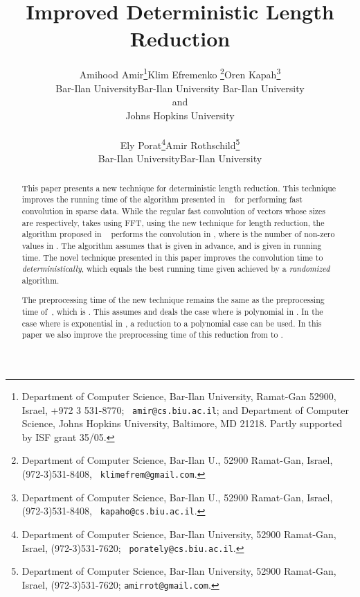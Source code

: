 \documentclass[11pt,amssymb]{article}
\begin{document}
\title{Improved Deterministic Length Reduction}

\author{
\begin{tabular}{ccc}
Amihood Amir\thanks{ Department of Computer Science, Bar-Ilan
University, Ramat-Gan 52900, Israel, +972 3 531-8770; {\tt
amir@cs.biu.ac.il}; and Department of Computer Science, Johns Hopkins
University, Baltimore, MD 21218. Partly supported by ISF grant 35/05.}
&
Klim Efremenko \thanks{Department of Computer Science,
Bar-Ilan U., 52900 Ramat-Gan, Israel, (972-3)531-8408, {\tt
klimefrem@gmail.com}.} &
Oren Kapah\thanks{Department of Computer Science,
Bar-Ilan U., 52900 Ramat-Gan, Israel, (972-3)531-8408, {\tt
kapaho@cs.biu.ac.il}.}
\\
{\small Bar-Ilan University} & {\small Bar-Ilan University} & {\small
  Bar-Ilan University}\\
{\small and} \\
{\small Johns Hopkins University} \\
\\
Ely Porat\thanks{ Department of Computer Science, Bar-Ilan
University, 52900 Ramat-Gan, Israel, (972-3)531-7620; {\tt
porately@cs.biu.ac.il}.} &&
Amir Rothschild\thanks{ Department of
Computer Science, Bar-Ilan University, 52900 Ramat-Gan, Israel,
(972-3)531-7620; {\tt amirrot@gmail.com}.}
\\
{\small Bar-Ilan University} && {\small Bar-Ilan University}
\end{tabular}
}

\date{}

\maketitle
\begin{abstract}
This paper presents a new technique for deterministic length reduction.
This technique improves the running time of the algorithm presented
in ~\cite{LR07} for performing fast convolution in sparse data.
While the regular fast convolution of vectors  whose sizes
are  respectively, takes  using FFT, using
the new technique for length reduction, the algorithm proposed in
~\cite{LR07} performs the convolution in , where
 is the number of non-zero values in . The algorithm
assumes that  is given in advance, and  is given in
running time. The novel technique presented in this paper improves the
convolution time to  {\sl deterministically}, which
equals the best running time given achieved by a {\sl randomized}
algorithm.

The preprocessing time of the new technique remains the same as the
preprocessing time of~\cite{LR07}, which is . This assumes
and deals the case where  is polynomial in
. In the case where  is exponential in , a
reduction to a polynomial case can be used. In this paper we also
improve the preprocessing time of this reduction from
 to .
\end{abstract}
\end{document}
